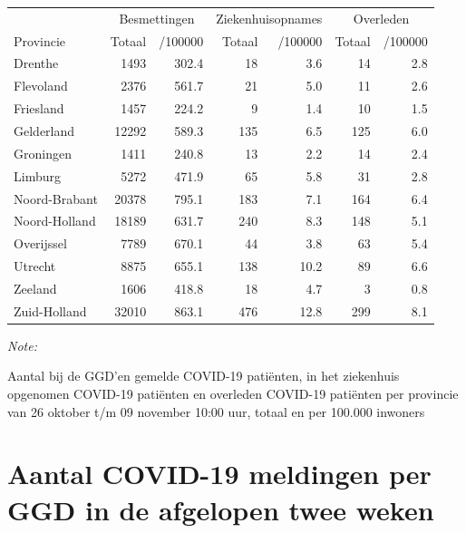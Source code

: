 \documentclass[
  english,
  man,floatsintext]{apa6}
\begin{document}
\begin{table}[H]
\centering
\begin{threeparttable}
\begin{tabular}{lrrrrrr}
\toprule
\multicolumn{1}{c}{ } & \multicolumn{2}{c}{Besmettingen} & \multicolumn{2}{c}{Ziekenhuisopnames} & \multicolumn{2}{c}{Overleden} \\
\cmidrule(l{3pt}r{3pt}){2-3} \cmidrule(l{3pt}r{3pt}){4-5} \cmidrule(l{3pt}r{3pt}){6-7}
Provincie & Totaal & /100000 & Totaal & /100000 & Totaal & /100000\\
\midrule
Drenthe & 1493 & 302.4 & 18 & 3.6 & 14 & 2.8\\
Flevoland & 2376 & 561.7 & 21 & 5.0 & 11 & 2.6\\
Friesland & 1457 & 224.2 & 9 & 1.4 & 10 & 1.5\\
Gelderland & 12292 & 589.3 & 135 & 6.5 & 125 & 6.0\\
Groningen & 1411 & 240.8 & 13 & 2.2 & 14 & 2.4\\
Limburg & 5272 & 471.9 & 65 & 5.8 & 31 & 2.8\\
Noord-Brabant & 20378 & 795.1 & 183 & 7.1 & 164 & 6.4\\
Noord-Holland & 18189 & 631.7 & 240 & 8.3 & 148 & 5.1\\
Overijssel & 7789 & 670.1 & 44 & 3.8 & 63 & 5.4\\
Utrecht & 8875 & 655.1 & 138 & 10.2 & 89 & 6.6\\
Zeeland & 1606 & 418.8 & 18 & 4.7 & 3 & 0.8\\
Zuid-Holland & 32010 & 863.1 & 476 & 12.8 & 299 & 8.1\\
\bottomrule
\end{tabular}
\begin{tablenotes}
\item \textit{Note: } 
\item Aantal bij de GGD’en gemelde COVID-19 patiënten, in het ziekenhuis opgenomen COVID-19 patiënten en overleden COVID-19 patiënten per provincie van 26 oktober t/m 09 november 10:00 uur, totaal en per 100.000 inwoners
\end{tablenotes}
\end{threeparttable}
\end{table}

\newpage

\hypertarget{aantal-covid-19-meldingen-per-ggd-in-de-afgelopen-twee-weken}{%
\section{Aantal COVID-19 meldingen per GGD in de afgelopen twee weken}\label{aantal-covid-19-meldingen-per-ggd-in-de-afgelopen-twee-weken}}
\end{document}

